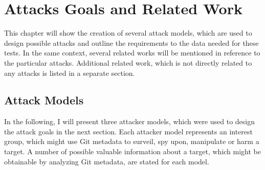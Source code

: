 \chapter{Attacks Goals and Related Work}\label{related-work}
This chapter will show the creation of several attack models, which are used to design possible attacks and outline the requirements to the data needed for these tests.
In the same context, several related works will be mentioned in reference to the particular attacks.
Additional related work, which is not directly related to any attacks is listed in a separate section.


\section{Attack Models}\label{attack-models}
In the following, I will present three attacker models, which were used to design the attack goals in the next section.
Each attacker model represents an interest group, which might use Git metadata to surveil, spy upon, manipulate or harm a target.
A number of possible valuable information about a target, which might be obtainable by analyzing Git metadata, are stated for each model.

